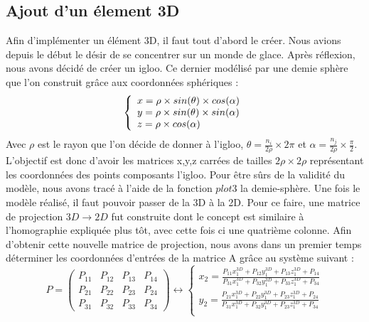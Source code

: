 \documentclass[blue]{ceri/sty/rapport}
\begin{document}
\subsection{Ajout d'un élement 3D}
\label{sec:OptionsClasse3}
Afin d'implémenter un élément 3D, il faut tout d'abord le créer. Nous avions depuis le début le désir de se concentrer sur un monde de glace. Après réflexion, nous avons décidé de créer un igloo. Ce dernier modélisé par une demie sphère que l'on construit grâce aux coordonnées sphériques : 
\\
\[
\left \{
   \begin{array}{l l l}
     x=\rho\times sin(\theta) \times cos(\alpha) \\
     y=\rho \times sin(\theta) \times sin(\alpha)  \\
     z=\rho \times cos(\alpha) 
    \end{array}
\right .
\]
Avec $\rho$ est le rayon que l'on décide de donner à l'igloo, $\theta = \frac{n_i}{2\rho}\times 2\pi$ et $\alpha = \frac{n_j}{2\rho}\times\frac{\pi}{2}$. L'objectif est donc d'avoir les matrices x,y,z carrées de tailles $2\rho\times2\rho$ représentant les coordonnées des points composants l'igloo. 
Pour être sûrs de la validité du modèle, nous avons tracé à l'aide de la fonction $plot3$ la demie-sphère. Une fois le modèle réalisé, il faut pouvoir passer de la 3D à la 2D. Pour ce faire, une matrice de projection $3D\longrightarrow2D$ fut construite dont le concept est similaire à l'homographie expliquée plus tôt, avec cette fois ci une quatrième colonne. Afin d'obtenir cette nouvelle matrice de projection, nous avons dans un premier temps déterminer les coordonnées d'entrées de la matrice A grâce au système suivant :
\vspace{0.5cm}
\[
P = \begin{pmatrix}P_{11}&P_{12}&P_{13}&P_{14}\\
P_{21}&P_{22}&P_{23}&P_{24}\\
P_{31}&P_{32}&P_{33}&P_{34}
\end{pmatrix}  
\longleftrightarrow
\left \{ 
\begin{array}{cc}
 x_2= \frac{P_{11}x_1^{3D} + P_{12}y_1^{3D} + P_{13}z_1^{3D} + P_{14}}{P_{31}x_1^{3D} + P_{32}y_1^{3D} + P_{33}z_1^{3D} + P_{34}}  \\
 y_2= \frac{P_{21}x_1^{3D} + P_{22}y_1^{3D} + P_{23}z_1^{3D} + P_{24}}{P_{31}x_1^{3D} + P_{32}y_1^{3D} + P_{23}z_1^{3D} + P_{34}}  \\
\end{array}
\right .  
\]
\vspace{0.5cm}
\end{document}
